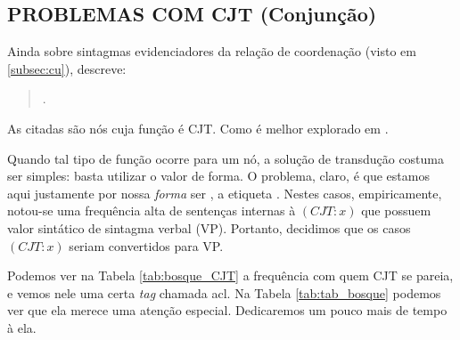 \subsection{PROBLEMAS COM CJT (Conjunção)}
\label{subsec:CJT}
Ainda sobre sintagmas evidenciadores da relação de coordenação (visto em \ref{subsec:cu}),  descreve: 
\begin{quote}
    .
\end{quote}

As  citadas são nós cuja função é CJT. Como é melhor explorado em \cite[p~96]{afonso2006arvores} .

Quando tal tipo de função ocorre para um nó, a solução de transdução costuma ser simples: basta utilizar o valor de forma. O problema, claro, é que estamos aqui justamente por nossa \textit{forma} ser , a etiqueta . Nestes casos, empiricamente, notou-se uma frequência alta de sentenças internas à $(CJT:x)$ que possuem valor sintático de sintagma verbal (VP). Portanto, decidimos que os casos $(CJT:x)$ seriam convertidos para VP.
\begin{center}
    
\end{center}
Podemos ver na Tabela \ref{tab:bosque_CJT} a frequência com quem CJT se pareia, e vemos nele uma certa \textit{tag} chamada acl. Na Tabela \ref{tab:tab_bosque} podemos ver que ela merece uma atenção especial. Dedicaremos um pouco mais de tempo à ela.
